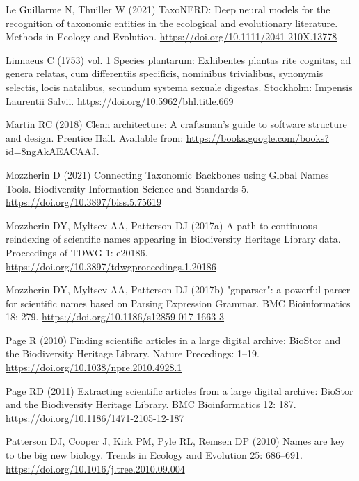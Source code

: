 \documentclass[
]{article}
\newlength{\cslhangindent}
\newlength{\cslentryspacingunit} %
\newenvironment{CSLReferences}[2] %
 {%
  \setlength{\parindent}{0pt}
  \ifodd #1
  \let\oldpar\par
  \def\par{\hangindent=\cslhangindent\oldpar}
  \fi
  \setlength{\parskip}{#2\cslentryspacingunit}
 }%
 {}
\begin{document}
\begin{CSLReferences}{1}{0}
\leavevmode{}%
Le Guillarme N, Thuiller W (2021) {TaxoNERD: Deep neural models for the
recognition of taxonomic entities in the ecological and evolutionary
literature}. Methods in Ecology and Evolution.
\url{https://doi.org/10.1111/2041-210X.13778}

\leavevmode{}%
Linnaeus C (1753) vol. 1 Species plantarum: Exhibentes plantas rite
cognitas, ad genera relatas, cum differentiis specificis, nominibus
trivialibus, synonymis selectis, locis natalibus, secundum systema
sexuale digestas. Stockholm: Impensis Laurentii Salvii.
\url{https://doi.org/10.5962/bhl.title.669}

\leavevmode{}%
Martin RC (2018) Clean architecture: A craftsman's guide to software
structure and design. Prentice Hall. Available from:
\url{https://books.google.com/books?id=8ngAkAEACAAJ}.

\leavevmode{}%
Mozzherin D (2021) {Connecting Taxonomic Backbones using Global Names
Tools}. Biodiversity Information Science and Standards 5.
\url{https://doi.org/10.3897/biss.5.75619}

\leavevmode{}%
Mozzherin DY, Myltsev AA, Patterson DJ (2017a) {A path to continuous
reindexing of scientific names appearing in Biodiversity Heritage
Library data}. Proceedings of TDWG 1: e20186.
\url{https://doi.org/10.3897/tdwgproceedings.1.20186}

\leavevmode{}%
Mozzherin DY, Myltsev AA, Patterson DJ (2017b) {"gnparser": a powerful
parser for scientific names based on Parsing Expression Grammar}. BMC
Bioinformatics 18: 279. \url{https://doi.org/10.1186/s12859-017-1663-3}

\leavevmode{}%
Page R (2010) {Finding scientific articles in a large digital archive:
BioStor and the Biodiversity Heritage Library}. Nature Precedings:
1--19. \url{https://doi.org/10.1038/npre.2010.4928.1}

\leavevmode{}%
Page RD (2011) {Extracting scientific articles from a large digital
archive: BioStor and the Biodiversity Heritage Library}. BMC
Bioinformatics 12: 187. \url{https://doi.org/10.1186/1471-2105-12-187}

\leavevmode{}%
Patterson DJ, Cooper J, Kirk PM, Pyle RL, Remsen DP (2010) {Names are
key to the big new biology}. Trends in Ecology and Evolution 25:
686--691. \url{https://doi.org/10.1016/j.tree.2010.09.004}


\end{CSLReferences}
\end{document}
